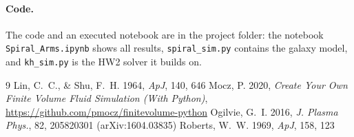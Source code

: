 \documentclass[11pt]{article}
\begin{document}
{\sloppy\paragraph{Code.} The code and an executed notebook are in the project folder: the notebook \texttt{Spiral\_Arms.ipynb} shows all results, \texttt{spiral\_sim.py} contains the galaxy model, and \texttt{kh\_sim.py} is the HW2 solver it builds on.\par}

\begin{thebibliography}{9}
 Lin, C.~C., \& Shu, F.~H. 1964, \textit{ApJ}, 140, 646
 Mocz, P. 2020, \textit{Create Your Own Finite Volume Fluid Simulation (With Python)}, \url{https://github.com/pmocz/finitevolume-python}
 Ogilvie, G.~I. 2016, \textit{J. Plasma Phys.}, 82, 205820301 (arXiv:1604.03835)
 Roberts, W.~W. 1969, \textit{ApJ}, 158, 123
\end{thebibliography}
\end{document}
